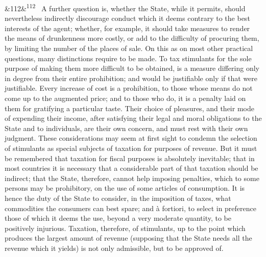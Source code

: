 \documentclass[12pt]{article}
\newcommand{\para}[1][]{\par\noindent\ifx&#1&\else\textsuperscript{\footnotesize #1}~\fi}
\begin{document}
\para[112] A further question is, whether the State, while it permits, should nevertheless indirectly discourage conduct which it deems contrary to the best interests of the agent; whether, for example, it should take measures to render the means of drunkenness more costly, or add to the difficulty of procuring them, by limiting the number of the places of sale. On this as on most other practical questions, many distinctions require to be made. To tax stimulants for the sole purpose of making them more difficult to be obtained, is a measure differing only in degree from their entire prohibition; and would be justifiable only if that were justifiable. Every increase of cost is a prohibition, to those whose means do not come up to the augmented price; and to those who do, it is a penalty laid on them for gratifying a particular taste. Their choice of pleasures, and their mode of expending their income, after satisfying their legal and moral obligations to the State and to individuals, are their own concern, and must rest with their own judgment. These considerations may seem at first sight to condemn the selection of stimulants as special subjects of taxation for purposes of revenue. But it must be remembered that taxation for fiscal purposes is absolutely inevitable; that in most countries it is necessary that a considerable part of that taxation should be indirect; that the State, therefore, cannot help imposing penalties, which to some persons may be prohibitory, on the use of some articles of consumption. It is hence the duty of the State to consider, in the imposition of taxes, what commodities the consumers can best spare; and à fortiori, to select in preference those of which it deems the use, beyond a very moderate quantity, to be positively injurious. Taxation, therefore, of stimulants, up to the point which produces the largest amount of revenue (supposing that the State needs all the revenue which it yields) is not only admissible, but to be approved of.
\end{document}
